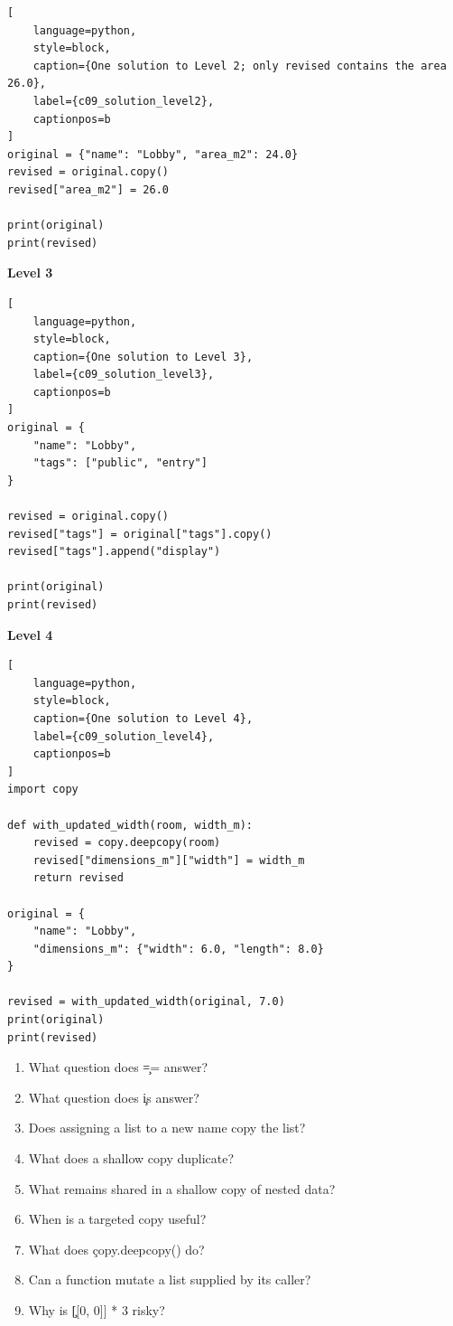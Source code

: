 \begin{lstlisting}[
    language=python,
    style=block,
    caption={One solution to Level 2; only revised contains the area 26.0},
    label={c09_solution_level2},
    captionpos=b
]
original = {"name": "Lobby", "area_m2": 24.0}
revised = original.copy()
revised["area_m2"] = 26.0

print(original)
print(revised)
\end{lstlisting}

\textbf{Level 3}

\begin{lstlisting}[
    language=python,
    style=block,
    caption={One solution to Level 3},
    label={c09_solution_level3},
    captionpos=b
]
original = {
    "name": "Lobby",
    "tags": ["public", "entry"]
}

revised = original.copy()
revised["tags"] = original["tags"].copy()
revised["tags"].append("display")

print(original)
print(revised)
\end{lstlisting}

\textbf{Level 4}

\begin{lstlisting}[
    language=python,
    style=block,
    caption={One solution to Level 4},
    label={c09_solution_level4},
    captionpos=b
]
import copy

def with_updated_width(room, width_m):
    revised = copy.deepcopy(room)
    revised["dimensions_m"]["width"] = width_m
    return revised

original = {
    "name": "Lobby",
    "dimensions_m": {"width": 6.0, "length": 8.0}
}

revised = with_updated_width(original, 7.0)
print(original)
print(revised)
\end{lstlisting}


\begin{enumerate}
    \item What question does \c{==} answer?
    \item What question does \c{is} answer?
    \item Does assigning a list to a new name copy the list?
    \item What does a shallow copy duplicate?
    \item What remains shared in a shallow copy of nested data?
    \item When is a targeted copy useful?
    \item What does \c{copy.deepcopy()} do?
    \item Can a function mutate a list supplied by its caller?
    \item Why is \c{[[0, 0]] * 3} risky?
\end{enumerate}

